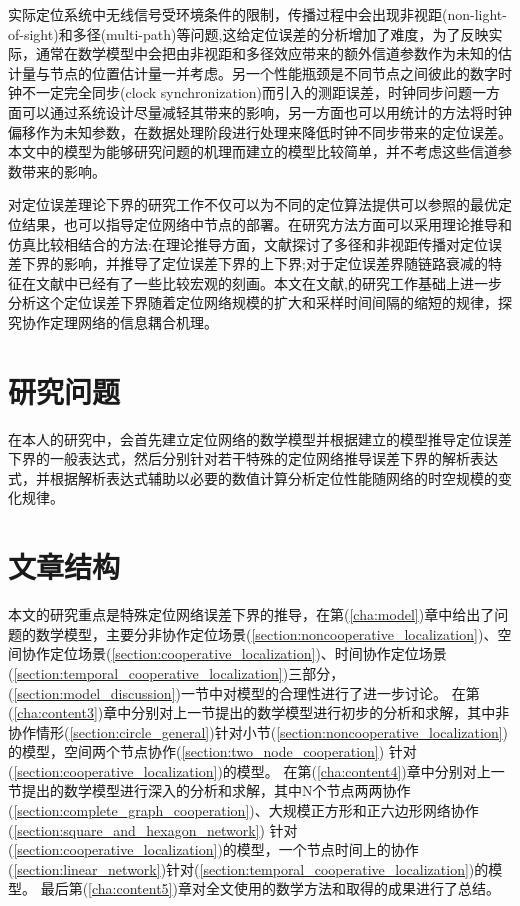 实际定位系统中无线信号受环境条件的限制，传播过程中会出现非视距(non-light-of-sight)和多径(multi-path)等问题\cite{indoorPos},这给定位误差的分析增加了难度，为了反映实际，通常在数学模型中会把由非视距和多径效应带来的额外信道参数作为未知的估计量与节点的位置估计量一并考虑\cite{LimitBound}。另一个性能瓶颈是不同节点之间彼此的数字时钟不一定完全同步(clock synchronization)而引入的测距误差\cite{indoorPos}，时钟同步问题一方面可以通过系统设计尽量减轻其带来的影响，另一方面也可以用统计的方法将时钟偏移作为未知参数，在数据处理阶段进行处理来降低时钟不同步带来的定位误差。本文中的模型为能够研究问题的机理而建立的模型比较简单，并不考虑这些信道参数带来的影响。

对定位误差理论下界的研究工作不仅可以为不同的定位算法提供可以参照的最优定位结果，也可以指导定位网络中节点的部署。在研究方法方面可以采用理论推导和仿真比较相结合的方法:在理论推导方面，文献\cite{LimitBound}探讨了多径和非视距传播对定位误差下界的影响，并推导了定位误差下界的上下界;对于定位误差界随链路衰减的特征在文献\cite{siyi}中已经有了一些比较宏观的刻画。本文在文献\cite{LimitBound},\cite{siyi}的研究工作基础上进一步分析这个定位误差下界随着定位网络规模的扩大和采样时间间隔的缩短的规律，探究协作定理网络的信息耦合机理。

\section{研究问题}
在本人的研究中，会首先建立定位网络的数学模型并根据建立的模型推导定位误差下界的一般表达式，然后分别针对若干特殊的定位网络推导误差下界的解析表达式，并根据解析表达式辅助以必要的数值计算分析定位性能随网络的时空规模的变化规律。

\section{文章结构}
本文的研究重点是特殊定位网络误差下界的推导，在第(\ref{cha:model})章中给出了问题的数学模型，主要分非协作定位场景(\ref{section:noncooperative_localization})、空间协作定位场景(\ref{section:cooperative_localization})、时间协作定位场景(\ref{section:temporal_cooperative_localization})三部分，(\ref{section:model_discussion})一节中对模型的合理性进行了进一步讨论。
在第(\ref{cha:content3})章中分别对上一节提出的数学模型进行初步的分析和求解，其中非协作情形(\ref{section:circle_general})针对小节(\ref{section:noncooperative_localization})的模型，空间两个节点协作(\ref{section:two_node_cooperation})
针对(\ref{section:cooperative_localization})的模型。
在第(\ref{cha:content4})章中分别对上一节提出的数学模型进行深入的分析和求解，其中N个节点两两协作(\ref{section:complete_graph_cooperation})、大规模正方形和正六边形网络协作(\ref{section:square_and_hexagon_network})
针对(\ref{section:cooperative_localization})的模型，一个节点时间上的协作(\ref{section:linear_network})针对(\ref{section:temporal_cooperative_localization})的模型。
最后第(\ref{cha:content5})章对全文使用的数学方法和取得的成果进行了总结。